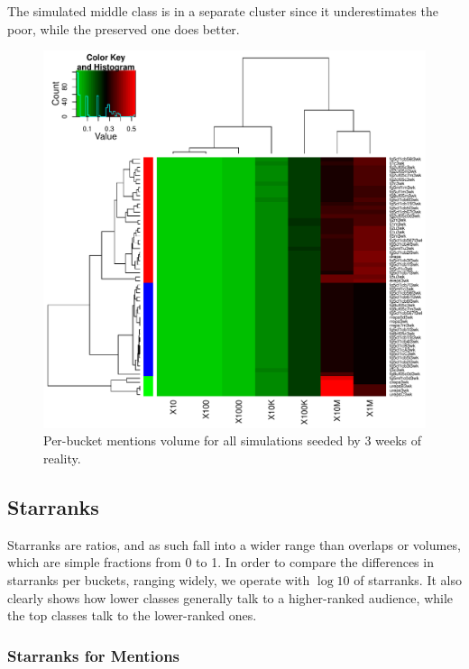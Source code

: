 \documentclass[10pt,oneside]{memoir}
\begin{document}
\begin{Spacing}{2}
The simulated middle class is in a separate cluster since it underestimates the poor, while the preserved one does better.



\begin{figure}
\begin{center}
    \includegraphics{figures/crop/heatmap-vols4-me-norm-medians-3wk}
    \caption{Per-bucket mentions volume for all simulations seeded by 3 weeks of reality.}
    \label{figure:heatmap-vols4-me-norm-medians-3wk}
\end{center}
\end{figure}
\pagebreak \subsection{Starranks}
\label{starranks}

Starranks are ratios, and as such fall into a wider range than overlaps or volumes, which are simple fractions from 0 to 1.  In order to compare the differences in starranks per buckets, ranging widely, we operate with $\log10$ of starranks.  It also clearly shows how lower classes generally talk to a higher-ranked audience, while the top classes talk to the lower-ranked ones.


\pagebreak \subsubsection{Starranks for Mentions}
\label{starranksformentions}


\end{Spacing}
\end{document}
